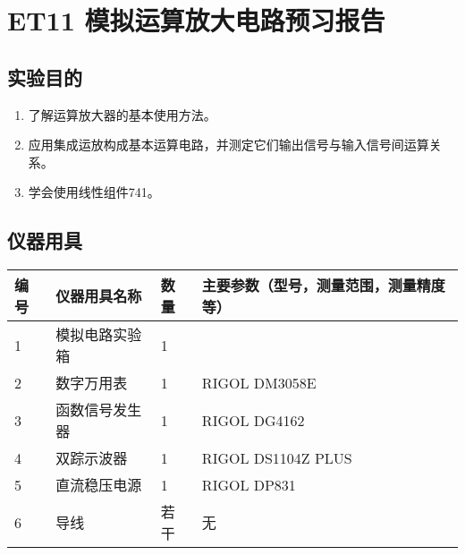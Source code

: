 \documentclass[dvipsnames, svgnames,a4paper,11pt]{article}
\begin{document}
	
	\clearpage
	\tableofcontents
	\clearpage
	
	
	
	
	\setcounter{section}{0}
	\section{ET11 模拟运算放大电路\quad\heiti 预习报告}
	
	\subsection{实验目的}
	\begin{enumerate}
		\item 了解运算放大器的基本使用方法。
		\item 应用集成运放构成基本运算电路，并测定它们输出信号与输入信号间运算关系。
		\item 学会使用线性组件741。 
		
	\end{enumerate}
	
	\subsection{仪器用具}
	\begin{table}[htbp]
		\centering
		\renewcommand\arraystretch{1.6}
		\begin{tabular}{p{}|p{}|p{}|p{}}
			\hline
			编号 & 仪器用具名称 & 数量 & 主要参数（型号，测量范围，测量精度等） \\
\hline
1 & 模拟电路实验箱 & 1 &  \\
2 & 数字万用表 & 1 & RIGOL DM3058E \\
3 & 函数信号发生器 & 1 & RIGOL DG4162 \\
4 & 双踪示波器 & 1 & RIGOL DS1104Z PLUS \\
5 & 直流稳压电源 & 1 & RIGOL DP831 \\
6 & 导线 & 若干 & 无 \\
			\hline
		\end{tabular}
	\end{table}
	
\end{document}
